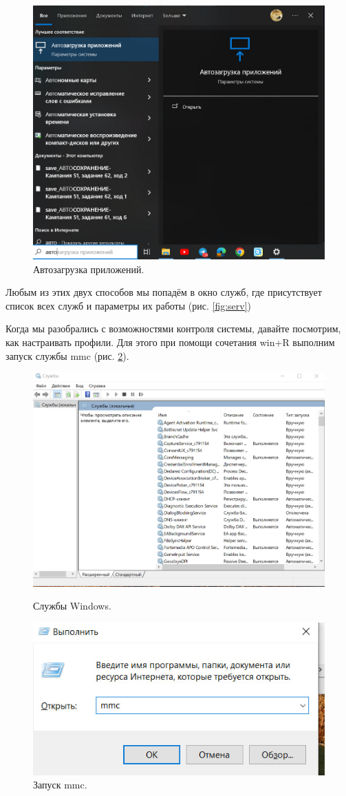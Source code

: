 \begin{figure}[h!]
    \centering
    \includegraphics[width=0.5\linewidth]{Pic/lab1/photo_2025-05-21_08-15-14.jpg}
    \caption{Автозагрузка приложений.}
    \label{fig:autoload}
\end{figure}

Любым из этих двух способов мы попадём в окно служб, где присутствует список всех служб и параметры их работы (рис. \ref{fig:serv})

Когда мы разобрались с возможностями контроля системы, давайте посмотрим, как настраивать профили. Для этого при помощи сочетания win+R выполним запуск службы mmc (рис. \ref{fig:mmc}). 

\begin{figure}[h!]
    \centering
    \begin{minipage}[p]{0.45\linewidth}
    \centering
    \includegraphics[width=0.7\linewidth]{Pic/lab1/photo_2025-05-21_08-15-15.jpg}
    \caption{Службы Windows.}
    \label{fig:serv}
    \end{minipage}
    \hfill
    \begin{minipage}[p]{0.45\linewidth}
    \centering
    \includegraphics[width=1\linewidth]{Pic/lab1/photo_2025-05-21_08-15-17.jpg}
    \caption{Запуск mmc.}
    \label{fig:mmc}
    \end{minipage}
\end{figure}

